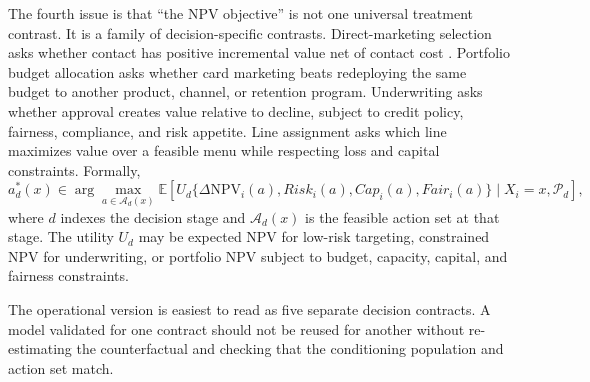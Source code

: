 \documentclass[11pt]{article}
\newcommand{\E}{\mathbb{E}}
\newcommand{\NPV}{\mathrm{NPV}}
\newcommand{\1}{\mathbf{1}}
\begin{document}
The fourth issue is that ``the NPV objective'' is not one universal treatment
contrast. It is a family of decision-specific contrasts. Direct-marketing
selection asks whether contact has positive incremental value net of contact
cost \citep{bult1995directmail}. Portfolio budget allocation asks whether card
marketing beats redeploying the same budget to another product, channel, or
retention program. Underwriting asks whether approval creates value relative to
decline, subject to credit policy, fairness, compliance, and risk appetite.
Line assignment asks which line maximizes value over a feasible menu while
respecting loss and capital constraints. Formally,
\begin{equation}
  a_d^*(x)
  \in
  \arg\max_{a\in\mathcal{A}_d(x)}
  \E[
    U_d\{\Delta \NPV_i(a),Risk_i(a),Cap_i(a),Fair_i(a)\}
    \mid X_i=x,\mathcal{P}_d
  ],
  \label{eq:decision-specific-policy}
\end{equation}
where $d$ indexes the decision stage and $\mathcal{A}_d(x)$ is the feasible
action set at that stage. The utility $U_d$ may be expected NPV for low-risk
targeting, constrained NPV for underwriting, or portfolio NPV subject to budget,
capacity, capital, and fairness constraints.

The operational version is easiest to read as five separate decision
contracts. A model validated for one contract should not be reused for another
without re-estimating the counterfactual and checking that the conditioning
population and action set match.
\end{document}
